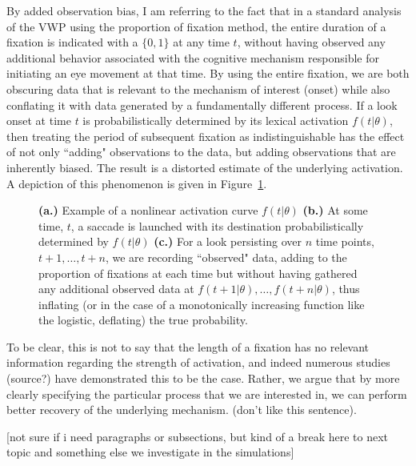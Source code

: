 By added observation bias, I am referring to the fact that in a standard analysis of the VWP using the proportion of fixation method, the entire duration of a fixation is indicated with a $\{0,1\}$ at any time $t$, without having observed any additional behavior associated with the cognitive mechanism responsible for initiating an eye movement at that time. By using the entire fixation, we are both obscuring data that is relevant to the mechanism of interest (onset) while also conflating it with data generated by a fundamentally different process. If a look onset at time $t$ is probabilistically determined by its lexical activation $f(t|\theta)$, then treating the period of subsequent fixation as indistinguishable has the effect of not only ``adding" observations to the data, but adding observations that are inherently biased. The result is a distorted estimate of the underlying activation. A depiction of this phenomenon is given in Figure~\ref{fig:folly_of_fixation}.

\begin{figure}[H]
    \centering
    \caption{ \textbf{(a.)} Example of a nonlinear activation curve $f(t|\theta)$ \textbf{(b.)} At some time, $t$, a saccade is launched with its destination probabilistically determined by $f(t|\theta)$ \textbf{(c.)} For a look persisting over $n$ time points, $t+1, \dots, t+n$, we are recording ``observed" data, adding to the proportion of fixations at each time but without having gathered any additional observed data at $f(t+1 | \theta), \dots,f(t+n | \theta)$, thus inflating (or in the case of a monotonically increasing function like the logistic, deflating) the true probability. }
\label{fig:folly_of_fixation}
\end{figure}

To be clear, this is not to say that the length of a fixation has no relevant information regarding the strength of activation, and indeed numerous studies (source?) have demonstrated this to be the case. Rather, we argue that by more clearly specifying the particular process that we are interested in, we can perform better recovery of the underlying mechanism. (don't like this sentence).

[not sure if i need paragraphs or subsections, but kind of a break here to next topic and something else we investigate in the simulations]

